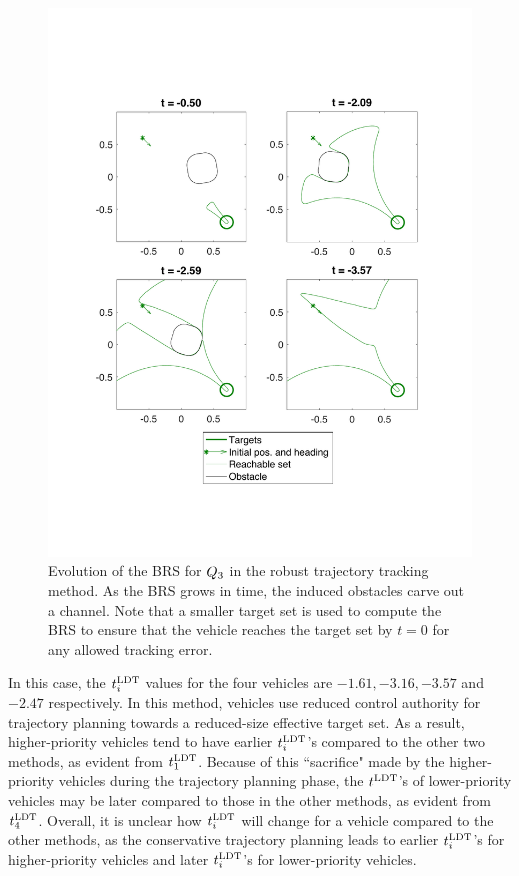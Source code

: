 \begin{figure}
  \centering
  \includegraphics[width=\columnwidth]{"fig/rtt_rs3"}
  \caption{Evolution of the BRS for $Q_3$ in the robust trajectory tracking method. As the BRS grows in time, the induced obstacles carve out a channel. Note that a smaller target set is used to compute the BRS to ensure that the vehicle reaches the target set by $t=0$ for any allowed tracking error.}
  \label{fig:rtt_rs3}
\end{figure}

In this case, the $t^\text{LDT}_i$ values for the four vehicles are $-1.61, -3.16, -3.57$ and $-2.47$ respectively. In this method, vehicles use reduced control authority for trajectory planning towards a reduced-size effective target set. As a result, higher-priority vehicles tend to have earlier $t^\text{LDT}_i$'s compared to the other two methods, as evident from $t^\text{LDT}_1$. Because of this ``sacrifice" made by the higher-priority vehicles during the trajectory planning phase, the $t^\text{LDT}$'s of lower-priority vehicles may be later compared to those in the other methods, as evident from $t^\text{LDT}_4$. Overall, it is unclear how $t^\text{LDT}_i$ will change for a vehicle compared to the other methods, as the conservative trajectory planning leads to earlier $t^\text{LDT}_i$'s for higher-priority vehicles and later $t^\text{LDT}_i$'s for lower-priority vehicles.